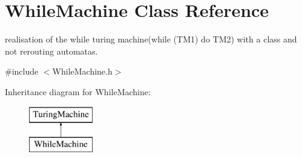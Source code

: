 \hypertarget{class_while_machine}{}\section{While\+Machine Class Reference}
\label{class_while_machine}


realisation of the while turing machine(while (\+T\+M1) do T\+M2) with a class and not rerouting automatas.  




{\ttfamily \#include $<$While\+Machine.\+h$>$}

Inheritance diagram for While\+Machine\+:\begin{figure}[H]
\begin{center}
\leavevmode
\includegraphics[height=2.000000cm]{class_while_machine}
\end{center}
\end{figure}
